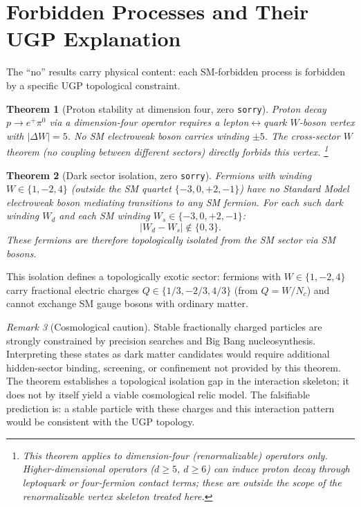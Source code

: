 \documentclass[12pt]{article}
\newtheorem{theorem}{Theorem}[section]
\theoremstyle{remark}
\newtheorem{remark}[theorem]{Remark}
\newcommand{\sorry}{\texttt{sorry}}
\begin{document}
\section{Forbidden Processes and Their UGP Explanation}
\label{sec:forbidden}

The ``no'' results carry physical content: each SM-forbidden process is
forbidden by a specific UGP topological constraint.

\begin{theorem}[Proton stability at dimension four, zero \sorry]
\label{thm:proton}
Proton decay $p \to e^+ \pi^0$ via a dimension-four operator requires a
lepton$\leftrightarrow$quark $W$-boson vertex with $|\Delta W| = 5$.  No SM
electroweak boson carries winding $\pm 5$.  The cross-sector $W$ theorem
(no coupling between different sectors) directly forbids this vertex.%
\footnote{This theorem applies to dimension-four (renormalizable) operators
only.  Higher-dimensional operators ($d \geq 5$, $d \geq 6$) can induce
proton decay through leptoquark or four-fermion contact terms; these are
outside the scope of the renormalizable vertex skeleton treated here.}
\end{theorem}

\begin{theorem}[Dark sector isolation, zero \sorry]
\label{thm:dark}
Fermions with winding $W \in \{1, -2, 4\}$ (outside the SM quartet
$\{-3, 0, +2, -1\}$) have no Standard Model electroweak boson mediating
transitions to any SM fermion.  For each such dark winding $W_d$ and each SM
winding $W_s \in \{-3, 0, +2, -1\}$:
\[
  |W_d - W_s| \notin \{0, 3\}.
\]
These fermions are therefore topologically isolated from the SM sector via SM
bosons.
\end{theorem}

This isolation defines a topologically exotic sector: fermions with $W \in
\{1,-2,4\}$ carry fractional electric charges $Q \in \{1/3, -2/3, 4/3\}$
(from $Q = W/N_c$) and cannot exchange SM gauge bosons with ordinary matter.

\begin{remark}[Cosmological caution]
Stable fractionally charged particles are strongly constrained by precision
searches and Big Bang nucleosynthesis.  Interpreting these states as dark matter
candidates would require additional hidden-sector binding, screening, or
confinement not provided by this theorem.  The theorem establishes a topological
isolation gap in the interaction skeleton; it does not by itself yield a viable
cosmological relic model.  The falsifiable prediction is: a stable particle with
these charges and this interaction pattern would be consistent with the UGP
topology.
\end{remark}
\end{document}
